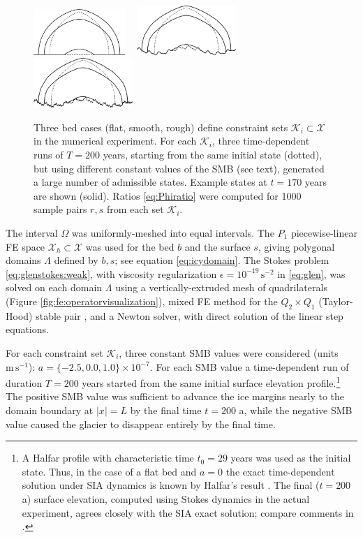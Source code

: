 \documentclass[hidelinks,onefignum,onetabnum,final]{siamart220329}  %
\newcommand{\eps}{\epsilon}
\newcommand{\cK}{\mathcal{K}}
\newcommand{\cX}{\mathcal{X}}
\begin{document}
\begin{figure}[ht]
\mbox{\includegraphics[width=0.31\textwidth]{figs/snapsflat.png} \, \includegraphics[width=0.335\textwidth]{figs/snapssmooth.png} \, \includegraphics[width=0.335\textwidth]{figs/snapsrough.png}}

\caption{Three bed cases (flat, smooth, rough) define constraint sets $\cK_i\subset\cX$ in the numerical experiment.  For each $\cK_i$, three time-dependent runs of $T=200$ years, starting from the same initial state (dotted), but using different constant values of the SMB (see text), generated a large number of admissible states.  Example states at $t=170$ years are shown (solid).  Ratios \eqref{eq:Phiratio} were computed for 1000 sample pairs $r,s$ from each set $\cK_i$.}
\label{fig:cases}
\end{figure}

The interval $\Omega$ was uniformly-meshed into equal intervals.  The $P_1$ piecewise-linear FE space $\cX_h\subset \cX$ was used for the bed $b$ and the surface $s$, giving polygonal domains $\Lambda$ defined by $b,s$; see equation \eqref{eq:icydomain}.  The Stokes problem \eqref{eq:glenstokes:weak}, with viscosity regularization $\eps=10^{-19}\, \text{s}^{-2}$ in \eqref{eq:glen}, was solved on each domain $\Lambda$ using a vertically-extruded mesh of quadrilaterals (Figure \ref{fig:fe:operatorvisualization}), mixed FE method for the $Q_2\times Q_1$ (Taylor-Hood) stable pair \cite{Elmanetal2014}, and a Newton solver, with direct solution of the linear step equations.

For each constraint set $\cK_i$, three constant SMB values were considered (units $\text{m}\,\text{s}^{-1}$): $a=\{-2.5,0.0,1.0\}\times 10^{-7}$.  For each SMB value a time-dependent run of duration $T=200$ years started from the same initial surface elevation profile.\footnote{A Halfar profile \cite{Halfar1981} with characteristic time $t_0=29$ years was used as the initial state.  Thus, in the case of a flat bed and $a=0$ the exact time-dependent solution under SIA dynamics is known by Halfar's result \cite{Halfar1981}.  The final ($t=200$ a) surface elevation, computed using Stokes dynamics in the actual experiment, agrees closely with the SIA exact solution; compare comments in \cite{LofgrenAhlkronaHelanow2022}.}  The positive SMB value was sufficient to advance the ice margins nearly to the domain boundary at $|x|=L$ by the final time $t=200$ a, while the negative SMB value caused the glacier to disappear entirely by the final time.
\end{document}
